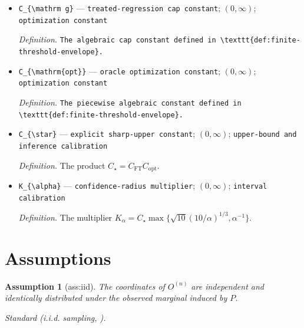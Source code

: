\documentclass{article}
\newtheorem{assumption}{Assumption}
\begin{document}
\begin{itemize}
  \par\smallskip\noindent\emph{Definition.} \texttt{The algebraic cap constant defined in \textbackslash{}\allowbreak{}texttt\{def:\allowbreak{}finite-\allowbreak{}threshold-\allowbreak{}envelope\}\allowbreak{}.}
  \item \texttt{C\_\allowbreak{}\{\textbackslash{}\allowbreak{}mathrm g\}\allowbreak{}} --- \texttt{treated-\allowbreak{}regression cap constant}; \((0,\infty)\); \texttt{optimization constant}
  \par\smallskip\noindent\emph{Definition.} \texttt{The algebraic cap constant defined in \textbackslash{}\allowbreak{}texttt\{def:\allowbreak{}finite-\allowbreak{}threshold-\allowbreak{}envelope\}\allowbreak{}.}
  \item \texttt{C\_\allowbreak{}\{\textbackslash{}\allowbreak{}mathrm\{opt\}\allowbreak{}\}\allowbreak{}} --- \texttt{oracle optimization constant}; \((0,\infty)\); \texttt{optimization constant}
  \par\smallskip\noindent\emph{Definition.} \texttt{The piecewise algebraic constant defined in \textbackslash{}\allowbreak{}texttt\{def:\allowbreak{}finite-\allowbreak{}threshold-\allowbreak{}envelope\}\allowbreak{}.}
  \item \texttt{C\_\allowbreak{}\{\textbackslash{}\allowbreak{}star\}\allowbreak{}} --- \texttt{explicit sharp-\allowbreak{}upper constant}; \((0,\infty)\); \texttt{upper-\allowbreak{}bound and inference calibration}
  \par\smallskip\noindent\emph{Definition.} The product \(C_{\star}=C_{\mathrm{FT}}C_{\mathrm{opt}}\).
  \item \texttt{K\_\allowbreak{}\{\textbackslash{}\allowbreak{}alpha\}\allowbreak{}} --- \texttt{confidence-\allowbreak{}radius multiplier}; \((0,\infty)\); \texttt{interval calibration}
  \par\smallskip\noindent\emph{Definition.} The multiplier \(K_{\alpha}=C_{\star}\max\{\sqrt{10}(10/\alpha)^{1/3},\alpha^{-1}\}\).
\end{itemize}

\section{Assumptions}

\begin{assumption}[ass:iid]\label{ass:iid}
The coordinates of \(O^{(n)}\) are independent and identically distributed under the observed marginal induced by \(P\).
\par\smallskip\noindent\emph{Standard} (i.i.d. sampling, \cite{ChernozhukovEtAl2018DML}).
\end{assumption}
\end{document}
